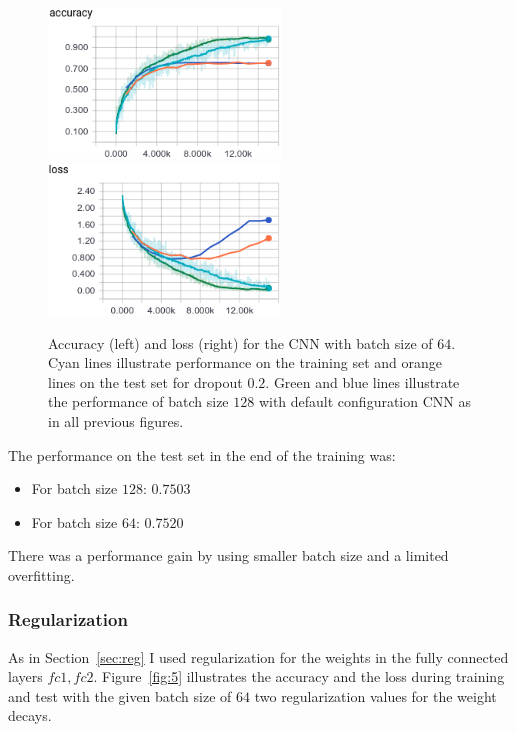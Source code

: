\documentclass{article}
\begin{document}
\begin{figure}[h!]
\centering
\includegraphics[height=4.0cm]{acc-linear-64.png}\
\includegraphics[height=4.0cm]{loss-linear-64.png}
\caption{Accuracy (left) and loss (right) for the CNN with batch size of $64$. Cyan lines illustrate performance on the training set and orange lines on the test set for dropout $0.2$. Green and blue lines illustrate the performance of batch size $128$ with default configuration CNN as in all previous figures.}
\label{fig:4}
\end{figure}
The performance on the test set in the end of the training was:
\begin{itemize}
\item For batch size $128$: $0.7503$
\item For batch size $64$: $\mathbf{0.7520}$
\end{itemize}
There was a performance gain by using smaller batch size and a limited overfitting.

\subsubsection{Regularization}
As in Section~\ref{sec:reg} I used regularization for the weights in the fully connected layers $fc1, fc2$.
Figure~\ref{fig:5} illustrates the accuracy and the loss during training and test with the given batch size of $64$ two regularization values for the weight decays.
\end{document}
